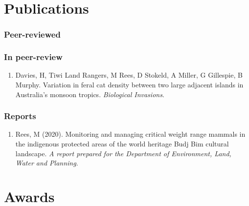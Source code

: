 \documentclass[10pt,a4paper,]{article}
\providecommand{\tightlist}{%
  \setlength{\itemsep}{0pt}\setlength{\parskip}{0pt}}
\newcounter{papers}
\begin{document}
\hypertarget{publications}{%
\section{Publications}\label{publications}}

\hypertarget{peer-reviewed}{%
\subsubsection{Peer-reviewed}\label{peer-reviewed}}

\newrefcontext[sorting=none]\setcounter{papers}{0}\pagebreak[3]
\printbibliography[category=bib-/Users/mrees2/Dropbox/personal/matt/github/cv/hyndman/Rees.bib-3378569,heading=none]\setcounter{papers}{0}

\nocite{1,
2}

\hypertarget{in-peer-review}{%
\subsubsection{In peer-review}\label{in-peer-review}}

\begin{enumerate}
\def\labelenumi{\arabic{enumi}.}
\tightlist
\item
  Davies, H, Tiwi Land Rangers, M Rees, D Stokeld, A Miller, G Gillespie, B Murphy. Variation in feral cat density between two large adjacent islands in Australia's monsoon tropics. \emph{Biological Invasions}.
\end{enumerate}

\hypertarget{reports}{%
\subsubsection{Reports}\label{reports}}

\begin{enumerate}
\def\labelenumi{\arabic{enumi}.}
\tightlist
\item
  Rees, M (2020). Monitoring and managing critical weight range mammals in the indigenous protected areas of the world heritage Budj Bim cultural landscape. \emph{A report prepared for the Department of Environment, Land, Water and Planning}.
\end{enumerate}

\hypertarget{awards}{%
\section{Awards}\label{awards}}
\end{document}
